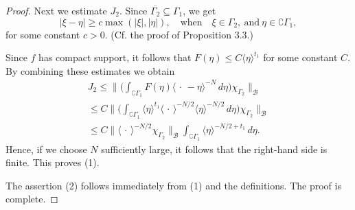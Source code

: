 \documentclass[12pt,a4paper,reqno]{amsart}
\numberwithin{equation}{section}
\numberwithin{thm}{section}
\theoremstyle{definition}
\theoremstyle{remark}
\begin{document}
\begin{proof}
\par

Next we estimate $J_2$. Since $\overline {\Gamma_2} \subseteq \Gamma_1$, we get
$$
|\xi -\eta |\ge c\max ( |\xi |,|\eta |),\quad \text{when}\quad \xi \in
\Gamma _2,\ \text{and}\ \eta \in \complement \Gamma _1,
$$
for some constant $c>0$. (Cf. the proof of Proposition 3.3.)

\par

Since $f$ has compact support, it follows that $F(\eta )\le C{\langle \eta\rangle} ^{t_1}$ for some constant $C$. By combining these estimates we
obtain
\begin{multline*}
J_2
\leq
\Big \| \Big (\int _{\complement \Gamma_1}F(\eta){\langle {{\, \cdot \, } -
\eta}\rangle}^{-N} \, d\eta \Big ) \chi _{\Gamma _2}\Big \| _{\mathscr{B}}
\\[1ex]
\leq
C\Big \| \Big ( \int_{\complement \Gamma_1}{\langle {\eta}\rangle}^{t_1}{\langle {\, \cdot \, }\rangle} ^{-N/2} {\langle \eta\rangle}^{-N/2} \, d\eta \Big ) \chi_{\Gamma_2}\Big \|
_{\mathscr{B}}
\\[1ex]
\leq
C\|{\langle {\, \cdot \, }\rangle} ^{-N/2}\chi_{\Gamma _2}\| _{\mathscr{B}} \int
_{\complement \Gamma_1} {\langle \eta\rangle}^{-N/2+t_1} \, d \eta.
\end{multline*}
Hence, if we choose $N$ sufficiently large, it follows that the
right-hand side is finite. This proves (1).

\par

The assertion (2) follows immediately from (1) and the
definitions. The proof is complete.
\end{proof}

\par
\end{document}
